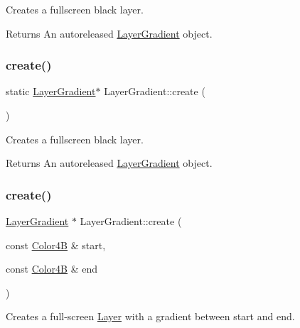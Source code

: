 Creates a fullscreen black layer.

\begin{DoxyReturn}{Returns}
An autoreleased \hyperlink{classLayerGradient}{Layer\+Gradient} object. 
\end{DoxyReturn}
\mbox{\label{classLayerGradient_af715c6b38e34ddb41cfa5a9a230cdf28}} 
\subsubsection{\texorpdfstring{create()}{create()}\hspace{0.1cm}{\footnotesize\ttfamily [2/6]}}
{\footnotesize\ttfamily static \hyperlink{classLayerGradient}{Layer\+Gradient}$\ast$ Layer\+Gradient\+::create (\begin{DoxyParamCaption}{ }\end{DoxyParamCaption})\hspace{0.3cm}{\ttfamily [static]}}

Creates a fullscreen black layer.

\begin{DoxyReturn}{Returns}
An autoreleased \hyperlink{classLayerGradient}{Layer\+Gradient} object. 
\end{DoxyReturn}
\mbox{\label{classLayerGradient_afffde737ba66c49d82ee6b7ebb77cac3}} 
\subsubsection{\texorpdfstring{create()}{create()}\hspace{0.1cm}{\footnotesize\ttfamily [3/6]}}
{\footnotesize\ttfamily \hyperlink{classLayerGradient}{Layer\+Gradient} $\ast$ Layer\+Gradient\+::create (\begin{DoxyParamCaption}\item[{const \hyperlink{structColor4B}{Color4B} \&}]{start,  }\item[{const \hyperlink{structColor4B}{Color4B} \&}]{end }\end{DoxyParamCaption})\hspace{0.3cm}{\ttfamily [static]}}

Creates a full-\/screen \hyperlink{classLayer}{Layer} with a gradient between start and end.


